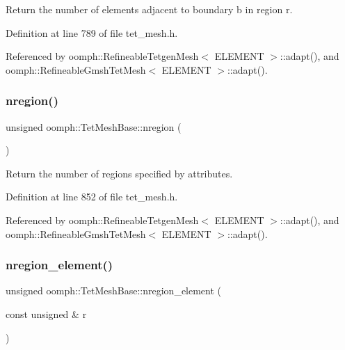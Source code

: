 Return the number of elements adjacent to boundary b in region r. 



Definition at line 789 of file tet\+\_\+mesh.\+h.



Referenced by oomph\+::\+Refineable\+Tetgen\+Mesh$<$ E\+L\+E\+M\+E\+N\+T $>$\+::adapt(), and oomph\+::\+Refineable\+Gmsh\+Tet\+Mesh$<$ E\+L\+E\+M\+E\+N\+T $>$\+::adapt().

\mbox{\label{classoomph_1_1TetMeshBase_a3d4d45ac64c6ee59cadf3a08d62a76f2}} 
\subsubsection{\texorpdfstring{nregion()}{nregion()}}
{\footnotesize\ttfamily unsigned oomph\+::\+Tet\+Mesh\+Base\+::nregion (\begin{DoxyParamCaption}{ }\end{DoxyParamCaption})\hspace{0.3cm}{\ttfamily [inline]}}



Return the number of regions specified by attributes. 



Definition at line 852 of file tet\+\_\+mesh.\+h.



Referenced by oomph\+::\+Refineable\+Tetgen\+Mesh$<$ E\+L\+E\+M\+E\+N\+T $>$\+::adapt(), and oomph\+::\+Refineable\+Gmsh\+Tet\+Mesh$<$ E\+L\+E\+M\+E\+N\+T $>$\+::adapt().

\mbox{\label{classoomph_1_1TetMeshBase_afe7b2d58a656feafd5ae725139aeb517}} 
\subsubsection{\texorpdfstring{nregion\+\_\+element()}{nregion\_element()}}
{\footnotesize\ttfamily unsigned oomph\+::\+Tet\+Mesh\+Base\+::nregion\+\_\+element (\begin{DoxyParamCaption}\item[{const unsigned \&}]{r }\end{DoxyParamCaption})\hspace{0.3cm}{\ttfamily [inline]}}




